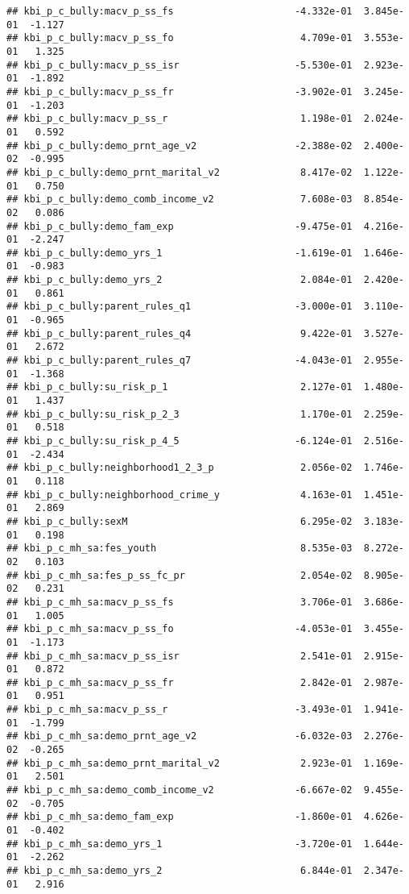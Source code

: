 \documentclass[
]{article}
\begin{document}
\begin{verbatim}
## kbi_p_c_bully:macv_p_ss_fs                     -4.332e-01  3.845e-01  -1.127
## kbi_p_c_bully:macv_p_ss_fo                      4.709e-01  3.553e-01   1.325
## kbi_p_c_bully:macv_p_ss_isr                    -5.530e-01  2.923e-01  -1.892
## kbi_p_c_bully:macv_p_ss_fr                     -3.902e-01  3.245e-01  -1.203
## kbi_p_c_bully:macv_p_ss_r                       1.198e-01  2.024e-01   0.592
## kbi_p_c_bully:demo_prnt_age_v2                 -2.388e-02  2.400e-02  -0.995
## kbi_p_c_bully:demo_prnt_marital_v2              8.417e-02  1.122e-01   0.750
## kbi_p_c_bully:demo_comb_income_v2               7.608e-03  8.854e-02   0.086
## kbi_p_c_bully:demo_fam_exp                     -9.475e-01  4.216e-01  -2.247
## kbi_p_c_bully:demo_yrs_1                       -1.619e-01  1.646e-01  -0.983
## kbi_p_c_bully:demo_yrs_2                        2.084e-01  2.420e-01   0.861
## kbi_p_c_bully:parent_rules_q1                  -3.000e-01  3.110e-01  -0.965
## kbi_p_c_bully:parent_rules_q4                   9.422e-01  3.527e-01   2.672
## kbi_p_c_bully:parent_rules_q7                  -4.043e-01  2.955e-01  -1.368
## kbi_p_c_bully:su_risk_p_1                       2.127e-01  1.480e-01   1.437
## kbi_p_c_bully:su_risk_p_2_3                     1.170e-01  2.259e-01   0.518
## kbi_p_c_bully:su_risk_p_4_5                    -6.124e-01  2.516e-01  -2.434
## kbi_p_c_bully:neighborhood1_2_3_p               2.056e-02  1.746e-01   0.118
## kbi_p_c_bully:neighborhood_crime_y              4.163e-01  1.451e-01   2.869
## kbi_p_c_bully:sexM                              6.295e-02  3.183e-01   0.198
## kbi_p_c_mh_sa:fes_youth                         8.535e-03  8.272e-02   0.103
## kbi_p_c_mh_sa:fes_p_ss_fc_pr                    2.054e-02  8.905e-02   0.231
## kbi_p_c_mh_sa:macv_p_ss_fs                      3.706e-01  3.686e-01   1.005
## kbi_p_c_mh_sa:macv_p_ss_fo                     -4.053e-01  3.455e-01  -1.173
## kbi_p_c_mh_sa:macv_p_ss_isr                     2.541e-01  2.915e-01   0.872
## kbi_p_c_mh_sa:macv_p_ss_fr                      2.842e-01  2.987e-01   0.951
## kbi_p_c_mh_sa:macv_p_ss_r                      -3.493e-01  1.941e-01  -1.799
## kbi_p_c_mh_sa:demo_prnt_age_v2                 -6.032e-03  2.276e-02  -0.265
## kbi_p_c_mh_sa:demo_prnt_marital_v2              2.923e-01  1.169e-01   2.501
## kbi_p_c_mh_sa:demo_comb_income_v2              -6.667e-02  9.455e-02  -0.705
## kbi_p_c_mh_sa:demo_fam_exp                     -1.860e-01  4.626e-01  -0.402
## kbi_p_c_mh_sa:demo_yrs_1                       -3.720e-01  1.644e-01  -2.262
## kbi_p_c_mh_sa:demo_yrs_2                        6.844e-01  2.347e-01   2.916

\end{verbatim}
\end{document}

